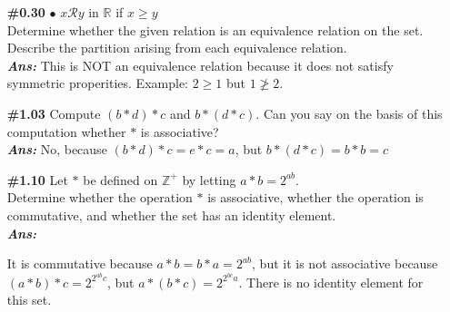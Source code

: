 \documentclass[12pt]{article}
\newcommand{\ind}{\hspace{0.2cm}}
\newcommand{\sol}{\setlength{\parindent}{0cm}\textbf{\textit{Ans:}}\setlength{\parindent}{1cm} }
\begin{document}
\begin{enumerate}[start=1,label={\bfseries Question \arabic*:},leftmargin=1in]
  \item[\textbf{\#0.30}] 
  $\bullet$ \ind $x \mathscr{R} y$  in $\mathbb{R}$ if $x \geq y$ \\
  Determine whether the given relation is an equivalence relation on the set. Describe the partition arising from each equivalence relation.\\
  \sol{
    This is NOT an equivalence relation because it does not satisfy symmetric properities. Example: $2 \geq 1$ but $1 \ngeq  2$.
  }

  \item[\textbf{\#1.03}]
  Compute \( (b * d) * c \) and \( b * (d * c) \). Can you say on the basis of this computation whether \( * \) is associative?\\
  \sol{No, because \( (b * d) * c = e*c = a \), but \( b * (d * c) = b*b = c\)}

  \item[\textbf{\#1.10}] Let \( * \) be defined on \( \mathbb{Z}^+ \) by letting \( a * b = 2^{ab} \).\\
  Determine whether the operation $*$ is associative, whether the operation is commutative, and whether the set has an identity element.\\
  \sol
  {It is commutative because $a*b = b*a = 2^{ab}$, but it is not associative because $(a*b)*c = 2^{2^{ab}c}$, but $a*(b*c) = 2^{2^{bc}a}$. There is no identity element for this set.
  
}
\end{enumerate}
\end{document}
